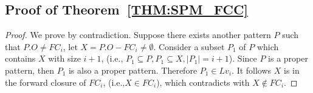 \subsection{Proof of Theorem~\ref{THM:SPM_FCC}}
\begin{proof}
We prove by contradiction. Suppose there exists another pattern $P$ such that $P.O \neq FC_i$, 
let $X=P.O - FC_i \neq \emptyset$. Consider a subset $P_1$ of $P$ which contains $X$ with size $i+1$, 
(i.e., $P_1 \subseteq P, P_1\subseteq X, |P_1|=i+1$). Since $P$ is a proper pattern, 
then $P_1$ is also a proper pattern. Therefore $P_1 \in Lv_i$.
It follows $X$ is in the forward closure of $FC_i$, (i.e.,$X \in FC_i$), which contradicts with $X\notin FC_i$.
\end{proof}
